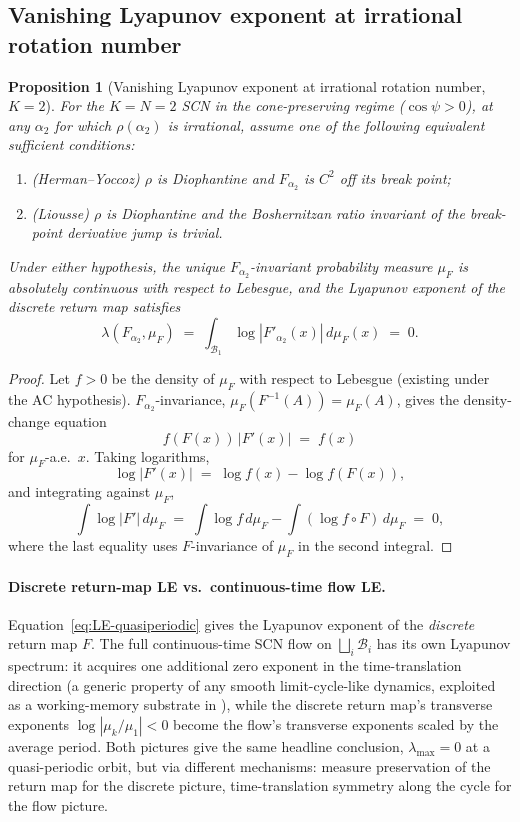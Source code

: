 \documentclass[12pt]{article}
\newcommand{\Bsp}{\mathcal{B}}
\newtheorem{proposition}{Proposition}
\begin{document}
\subsection{Vanishing Lyapunov exponent at irrational rotation number}\label{app:quasi-LE}

\begin{proposition}[Vanishing Lyapunov exponent at irrational rotation number, $K{=}2$]\label{prop:quasi-LE}
For the $K{=}N{=}2$ SCN in the cone-preserving regime ($\cos\psi>0$), at any $\alpha_2$ for which $\rho(\alpha_2)$ is irrational, assume one of the following equivalent sufficient conditions:
\begin{enumerate}[label=(\alph*),nosep]
    \item (Herman--Yoccoz) $\rho$ is Diophantine and $F_{\alpha_2}$ is $C^2$ off its break point;
    \item (Liousse) $\rho$ is Diophantine and the Boshernitzan ratio invariant of the break-point derivative jump is trivial.
\end{enumerate}
Under either hypothesis, the unique $F_{\alpha_2}$-invariant probability measure $\mu_F$ is absolutely continuous with respect to Lebesgue, and the Lyapunov exponent of the discrete return map satisfies
\begin{equation}\label{eq:LE-quasiperiodic}
\lambda(F_{\alpha_2},\mu_F) \;=\; \int_{\Bsp_1} \log|F'_{\alpha_2}(x)|\,d\mu_F(x) \;=\; 0.
\end{equation}
\end{proposition}

\begin{proof}
Let $f>0$ be the density of $\mu_F$ with respect to Lebesgue (existing under the AC hypothesis). $F_{\alpha_2}$-invariance, $\mu_F(F^{-1}(A))=\mu_F(A)$, gives the density-change equation
\[
f(F(x))\,|F'(x)| \;=\; f(x)
\]
for $\mu_F$-a.e.\ $x$. Taking logarithms,
\[
\log|F'(x)| \;=\; \log f(x) - \log f(F(x)),
\]
and integrating against $\mu_F$,
\[
\int\log|F'|\,d\mu_F \;=\; \int\log f\,d\mu_F - \int(\log f\circ F)\,d\mu_F \;=\; 0,
\]
where the last equality uses $F$-invariance of $\mu_F$ in the second integral.
\end{proof}

\paragraph{Discrete return-map LE vs.\ continuous-time flow LE.}
Equation~\eqref{eq:LE-quasiperiodic} gives the Lyapunov exponent of the \emph{discrete} return map $F$. The full continuous-time SCN flow on $\bigsqcup_i\Bsp_i$ has its own Lyapunov spectrum: it acquires one additional zero exponent in the time-translation direction (a generic property of any smooth limit-cycle-like dynamics, exploited as a working-memory substrate in \citealp{Park2023a}), while the discrete return map's transverse exponents $\log|\mu_k/\mu_1|<0$ become the flow's transverse exponents scaled by the average period. Both pictures give the same headline conclusion, $\lambda_{\max}=0$ at a quasi-periodic orbit, but via different mechanisms: measure preservation of the return map for the discrete picture, time-translation symmetry along the cycle for the flow picture.
\end{document}
